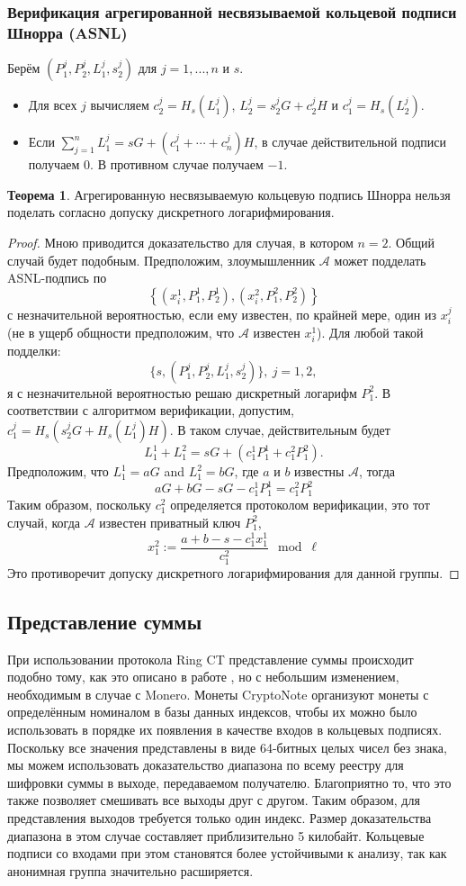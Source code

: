 \documentclass{mrl}
\theoremstyle{definition}
\newtheorem{thm}{Теорема}
\numberwithin{thm}{section}
\begin{document}
\subsubsection{Верификация агрегированной несвязываемой кольцевой подписи Шнорра (ASNL)}
Берём $(P_1^j, P_2^j, L_1^j, s_2^j)$ для $j=1,...,n$ и $s$.
\begin{itemize}
 \item Для всех $j$ вычисляем $c_2^j = H_s (L_1^j)$, $L_2^j = s_2^j G + c_2^j H$ и $c_1^j = H_s(L_2^j)$.
 \item Если $\sum_{j=1}^n L_1^j = s G + (c_1^j + \cdots + c_n^j) H$, в случае действительной подписи получаем $0$. В противном случае получаем $-1$.
\end{itemize}
 \begin{thm}
Агрегированную несвязываемую кольцевую подпись Шнорра нельзя поделать согласно допуску дискретного логарифмирования.
 \end{thm}
\begin{proof}
Мною приводится доказательство для случая, в котором $n=2$. Общий случай будет подобным. Предположим, злоумышленник $\mathcal{A}$ может подделать ASNL-подпись по
\[
\left\{ (x_i^1, P_1^1, P_2^1), (x_i^2, P_1^2, P_2^2) \right\}
 \]
с незначительной вероятностью, если ему известен, по крайней мере, один из $x_i^j$ (не в ущерб общности предположим, что $\mathcal{A}$ известен $x_i^1$). Для любой такой подделки:
 \[
\{s,(P_1^j, P_2^j, L_1^j, s_2^j)\},\ j=1,2,
 \]
я с незначительной вероятностью решаю дискретный логарифм $P_1^2$. В соответствии с алгоритмом верификации, допустим, $c_1^j = H_s\left(s_2^j G + H_s(L_1^j)H\right)$. В таком случае, действительным будет
\[
 L_1^1 + L_1^2 = sG + \left(c_1^1 P_1^1 + c_1^2 P_1^2\right).
\]
Предположим, что $L_1^1 = a G$ and $L_1^2 = bG$, где $a$ и $b$ известны $\mathcal{A}$, тогда
\[
 aG + bG - sG - c_1^1 P_1^1 = c_1^2 P_1^2
\]
Таким образом, поскольку $c_1^2$ определяется протоколом верификации, это тот случай, когда $\mathcal{A}$ известен приватный ключ $P_1^2$,
\[
 x_1^2 := \frac{a+b-s-c_1^1 x_1^1}{c_1^2} \mod \ell
\]
Это противоречит допуску дискретного логарифмирования для данной группы.
\end{proof}
\subsection{Представление суммы}
При использовании протокола Ring CT представление суммы происходит подобно тому, как это описано в работе \cite{GM}, но с небольшим изменением, необходимым в случае с Monero. Монеты CryptoNote организуют монеты с определённым номиналом в базы данных индексов, чтобы их можно было использовать в порядке их появления в качестве входов в кольцевых подписях. Поскольку все значения представлены в виде 64-битных целых чисел без знака, мы можем использовать доказательство диапазона по всему реестру для шифровки суммы в выходе, передаваемом получателю. Благоприятно то, что это также позволяет смешивать все выходы друг с другом. Таким образом, для представления выходов требуется только один индекс. Размер доказательства диапазона в этом случае составляет приблизительно 5 килобайт. Кольцевые подписи со входами при этом становятся более устойчивыми к анализу, так как анонимная группа значительно расширяется.
\end{document}
